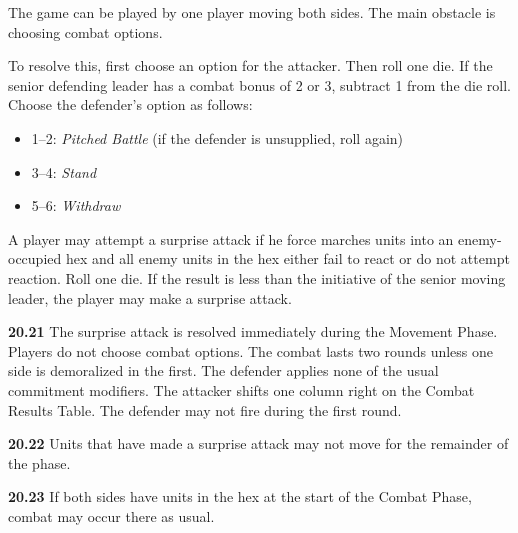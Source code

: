 

The game can be played by one player moving both sides. The main obstacle is choosing combat options.

To resolve this, first choose an option for the attacker. Then roll one die. If the senior defending leader has a combat bonus of 2 or 3, subtract 1 from the die roll. Choose the defender's option as follows:
\begin{itemize}
\item 1--2: \textit{Pitched Battle} (if the defender is unsupplied, roll again)
\item 3--4: \textit{Stand}
\item 5--6: \textit{Withdraw}
\end{itemize}


A player may attempt a surprise attack if he force marches units into an enemy-occupied hex and all enemy units in the hex either fail to react or do not attempt reaction. Roll one die. If the result is less than the initiative of the senior moving leader, the player may make a surprise attack.

\textbf{20.21} The surprise attack is resolved immediately during the Movement Phase. Players do not choose combat options. The combat lasts two rounds unless one side is demoralized in the first. The defender applies none of the usual commitment modifiers. The attacker shifts one column right on the Combat Results Table. The defender may not fire during the first round.

\textbf{20.22} Units that have made a surprise attack may not move for the remainder of the phase.

\textbf{20.23} If both sides have units in the hex at the start of the Combat Phase, combat may occur there as usual.
